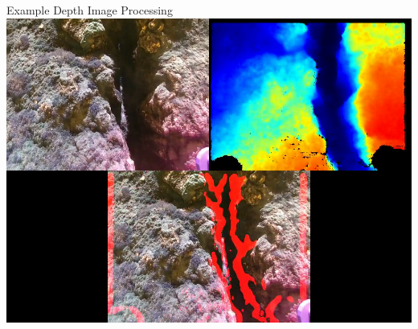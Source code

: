 \documentclass[aspectratio=169]{beamer}
\begin{document}
\begin{frame}{Example Depth Image Processing}
	\centering
	\includegraphics[height=\textheight]{./images/depth_processing_screenshot}
\end{frame}
\end{document}

